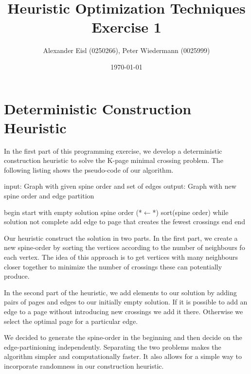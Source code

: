 \documentclass{scrartcl}
\author{Alexander Eisl (0250266), Peter Wiedermann (0025999)}
\date{\today}
\title{Heuristic Optimization Techniques \\ Exercise 1}
\begin{document}
\maketitle


\section{Deterministic Construction Heuristic}
In the first part of this programming exercise, we develop a
deterministic construction heuristic to solve the K-page minimal
crossing problem. The following listing shows the pseudo-code of our
algorithm.

\begin{algorithm}[caption={Deterministic construction heuristic}]
    input: Graph with given spine order and set of edges
    output: Graph with new spine order and edge partition

    begin
       start with empty solution
       spine order (*$\leftarrow$*) sort(spine order)
       while solution not complete
           add edge to page that creates the fewest crossings
       end 
    end
\end{algorithm}

Our heuristic construct the solution in two parts. In the first part,
we create a new spine-order by sorting the vertices according to the
number of neighbours fo each vertex. The idea of this approach is to
get vertices with many neighbours closer together to minimize the
number of crossings these can potentially produce.

In the second part of the heuristic, we add elements to our solution
by adding pairs of pages and edges to our initially empty solution.
If it is possible to add an edge to a page without introducing new
crossings we add it there. Otherwise we select the optimal page for a
particular edge.

We decided to generate the spine-order in the beginning and then
decide on the edge-partinioning independently. Separating the two
problems makes the algorithm simpler and computationally faster. It
also allows for a simple way to incorporate randomness in our
construction heuristic.
\end{document}
